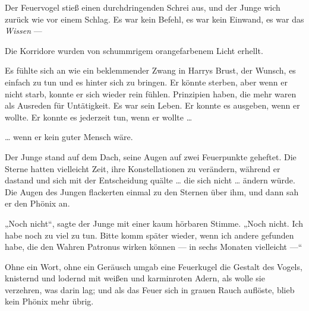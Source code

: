 Der Feuervogel stieß einen durchdringenden Schrei aus, und der Junge wich zurück wie vor einem Schlag. Es war kein Befehl, es war kein Einwand, es war das \emph{Wissen} —

Die Korridore wurden von schummrigem orangefarbenem Licht erhellt.

Es fühlte sich an wie ein beklemmender Zwang in Harrys Brust, der Wunsch, es einfach zu tun und es hinter sich zu bringen. Er könnte sterben, aber wenn er nicht starb, konnte er sich wieder rein fühlen. Prinzipien haben, die mehr waren als Ausreden für Untätigkeit. Es war sein Leben. Er konnte es ausgeben, wenn er wollte. Er konnte es jederzeit tun, wenn er wollte …

… wenn er kein guter Mensch wäre.

\later

Der Junge stand auf dem Dach, seine Augen auf zwei Feuerpunkte geheftet. Die Sterne hatten vielleicht Zeit, ihre Konstellationen zu verändern, während er dastand und sich mit der Entscheidung quälte … die sich nicht … ändern würde.
Die Augen des Jungen flackerten einmal zu den Sternen über ihm, und dann sah er den Phönix an.

„Noch nicht“, sagte der Junge mit einer kaum hörbaren Stimme.
„Noch nicht. Ich habe noch zu viel zu tun. Bitte komm später wieder, wenn ich andere gefunden habe, die den Wahren Patronus wirken können — in sechs Monaten vielleicht —“

Ohne ein Wort, ohne ein Geräusch umgab eine Feuerkugel die Gestalt des Vogels, knisternd und lodernd mit weißen und karminroten Adern, als wolle sie verzehren, was darin lag; und als das Feuer sich in grauen Rauch auflöste, blieb kein Phönix mehr übrig.

